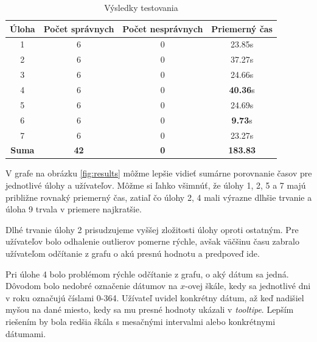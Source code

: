 \begin{table}[h]
\centering
\caption{Výsledky testovania}
\label{table:results}
\begin{tabular}{|c|c|c|c|}
\hline
\rowcolor[HTML]{9B9B9B} \textbf{Úloha} & \textbf{Počet správnych} & \textbf{Počet nesprávnych} & \textbf{Priemerný čas} \\ \hline
1              &            6             &             0              &         23.85s                       \\ \hline
2              &            6             &             0              &         37.27s                      \\ \hline
3              &            6             &             0              &         24.66s                      \\ \hline
4              &            6             &             0              &         \textbf{40.36}s                      \\ \hline
5              &            6             &             0              &         24.69s                      \\ \hline
6              &            6             &             0              &         \textbf{9.73}s                      \\ \hline
7              &            6             &             0              &         23.27s                       \\ \hline
\rowcolor[HTML]{C0C0C0} \textbf{Suma}  &           \textbf{42}             &             \textbf{0}              &        \textbf{183.83}                      \\ \hline
\end{tabular}
\end{table}

V grafe na obrázku \ref{fig:results} môžme lepšie vidieť sumárne porovnanie časov pre jednotlivé úlohy a užívateľov. Môžme si ľahko všimnúť, že úlohy 1, 2, 5 a 7 majú približne rovnaký priemerný čas, zatiaľ čo úlohy 2, 4 mali výrazne dlhšie trvanie a úloha 9 trvala v priemere najkratšie.

Dlhé trvanie úlohy 2 prisudzujeme vyššej zložitosti úlohy oproti ostatným. Pre užívateľov bolo odhalenie outlierov pomerne rýchle, avšak väčšinu času zabralo užívateľom odčítanie z grafu o akú presnú hodnotu a predpoveď ide.

Pri úlohe 4 bolo problémom rýchle odčítanie z grafu, o aký dátum sa jedná. Dôvodom bolo nedobré označenie dátumov na \mbox{$ x $-ovej} škále, kedy sa jednotlivé dni v roku označujú číslami 0-364. Užívateľ uvidel konkrétny dátum, až keď nadišiel myšou na dané miesto, kedy sa mu presné hodnoty ukázali v \textit{tooltipe}. Lepším riešením by bola redšia škála s mesačnými intervalmi alebo konkrétnymi dátumami.

